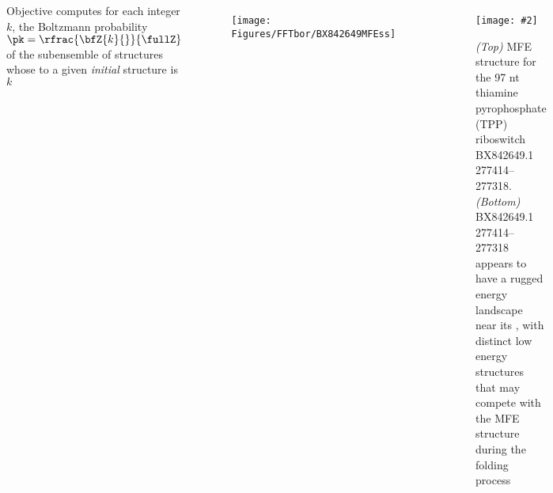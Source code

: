 \documentclass{beamer}
\newcommand{\slidefigure}[2][1]{\centering\texttt{[image: \#2]}}
\begin{document}
\begin{frame}
  \frametitle{\fftbor}

  \begin{columns}
    \begin{block}
      {Objective}
      \fftbor computes for each integer $k$, the Boltzmann probability $\pk = \rfrac{\bfZ{k}{}}{\fullZ}$ of the subensemble of structures whose \bpd to a given {\em initial} structure \strSt is $k$
    \end{block}

    \vspace{-4em}
    \begin{figure}
      \centering \texttt{[image: Figures/FFTbor/BX842649MFEss]}
    \end{figure}
    \vspace{-5em}
    \begin{figure}
      \slidefigure{Figures/FFTbor/FFTbor_BX842649_1} \caption{{\em (Top)} MFE structure for the 97 nt thiamine pyrophosphate (TPP) riboswitch BX842649.1 277414--277318. {\em (Bottom)} BX842649.1 277414--277318 appears to have a rugged energy landscape near its \mfes, with distinct low energy structures that may compete with the MFE structure during the folding process}
    \end{figure}
  \end{columns}
\end{frame}
\end{document}
